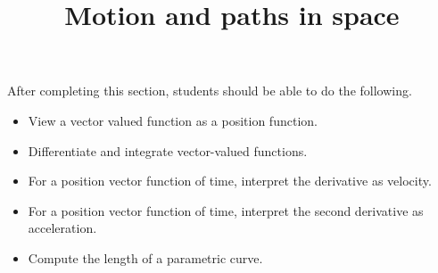 \documentclass{ximera}
\title{Motion and paths in space}
\begin{document}
\begin{abstract}
\end{abstract}

\maketitle

\begin{sectionOutcomes}

After completing this section, students should be able to do the following.

\begin{itemize}
\item View a vector valued function as a position function.
\item Differentiate and integrate vector-valued functions.
\item For a position vector function of time, interpret
  the derivative as velocity.
\item For a position vector function of time, interpret the second
  derivative as acceleration.
\item Compute the length of a parametric curve.
\end{itemize}

\end{sectionOutcomes}
\end{document}
